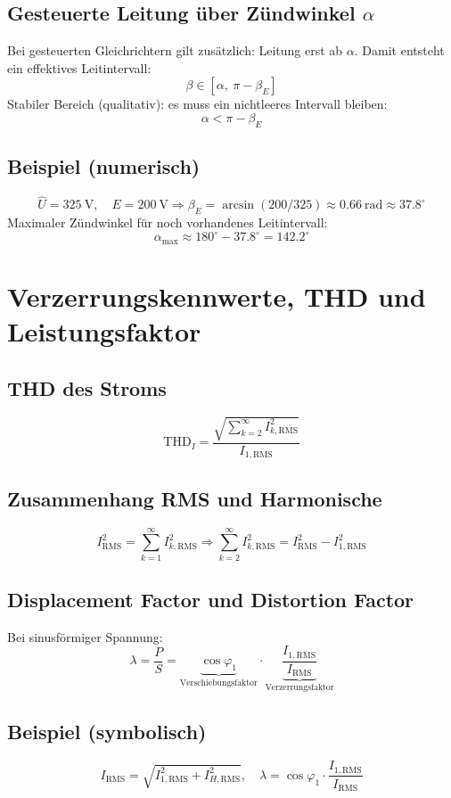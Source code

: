 \documentclass[a4paper,11pt]{article}
\begin{document}
\subsection{Gesteuerte Leitung über Zündwinkel $\alpha$}
Bei gesteuerten Gleichrichtern gilt zusätzlich: Leitung erst ab $\alpha$.
Damit entsteht ein effektives Leitintervall:
\[
\beta \in [\alpha,\ \pi-\beta_E]
\]
Stabiler Bereich (qualitativ): es muss ein nichtleeres Intervall bleiben:
\[
\alpha < \pi - \beta_E
\]

\subsection*{Beispiel (numerisch)}
\[
\hat{U}=\SI{325}{\volt},\quad E=\SI{200}{\volt}
\Rightarrow
\beta_E=\arcsin(200/325)\approx 0.66\ \mathrm{rad}\approx 37.8^\circ
\]
Maximaler Zündwinkel für noch vorhandenes Leitintervall:
\[
\alpha_{\max}\approx 180^\circ-37.8^\circ=142.2^\circ
\]

\section{Verzerrungskennwerte, THD und Leistungsfaktor}

\subsection{THD des Stroms}
\[
\mathrm{THD}_I = \frac{\sqrt{\sum_{k=2}^{\infty} I_{k,\mathrm{RMS}}^2}}{I_{1,\mathrm{RMS}}}
\]

\subsection{Zusammenhang RMS und Harmonische}
\[
I_{\mathrm{RMS}}^2 = \sum_{k=1}^{\infty} I_{k,\mathrm{RMS}}^2
\Rightarrow
\sum_{k=2}^{\infty} I_{k,\mathrm{RMS}}^2 = I_{\mathrm{RMS}}^2 - I_{1,\mathrm{RMS}}^2
\]

\subsection{Displacement Factor und Distortion Factor}
Bei sinusförmiger Spannung:
\[
\lambda = \frac{P}{S} = \underbrace{\cos\varphi_1}_{\text{Verschiebungsfaktor}}
\cdot
\underbrace{\frac{I_{1,\mathrm{RMS}}}{I_{\mathrm{RMS}}}}_{\text{Verzerrungsfaktor}}
\]

\subsection*{Beispiel (symbolisch)}
\[
I_{\mathrm{RMS}}=\sqrt{I_{1,\mathrm{RMS}}^2+I_{H,\mathrm{RMS}}^2},\quad
\lambda=\cos\varphi_1\cdot \frac{I_{1,\mathrm{RMS}}}{I_{\mathrm{RMS}}}
\]
\end{document}
